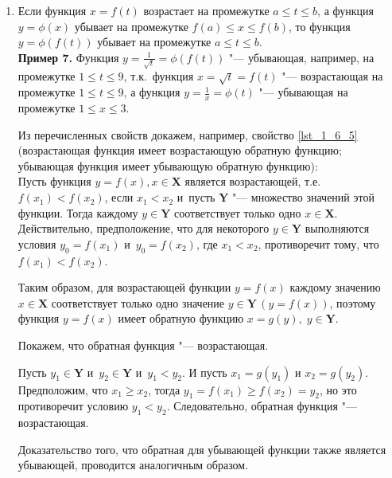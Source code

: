 \begin{enumerate}
\item Если функция $x = f(t)$  возрастает на промежутке
$a \leqslant t \leqslant b$,
а функция $y = \phi(x)$ убывает на промежутке
$f(a) \leqslant x \leqslant f(b)$, 
то функция $y = \phi(f(t))$ убывает на промежутке
$a \leqslant t \leqslant b$. \\
\textbf{Пример 7.} Функция
$\displaystyle y = \frac{1}{\sqrt{t}} = \phi(f(t))$ "--- убывающая,
например, на промежутке $1 \leqslant t \leqslant 9$,
т.к.\ функция $x = \sqrt{t} = f(t)$ "--- возрастающая на промежутке
$1 \leqslant t \leqslant 9$, а функция
$\displaystyle y = \frac{1}{x} = \phi(t)$
"--- убывающая на промежутке $1 \leqslant x \leqslant 3$.

Из перечисленных свойств докажем, например, свойство \ref{lst_1_6_5}
(возрастающая функция имеет возрастающую обратную функцию;
убывающая функция имеет убывающую обратную функцию): \\
Пусть функция $y = f(x), x \in \mathbf{X}$ является возрастающей,
т.е.\ $f(x_{1}) < f(x_{2})$, если $x_{1} < x_{2}$ и~пусть $\mathbf{Y}$
"--- множество значений этой функции. Тогда каждому $y \in \mathbf{Y}$
соответствует только одно $x \in \mathbf{X}$.
Действительно, предположение, что для некоторого $y \in \mathbf{Y}$
выполняются условия $y_{0} = f(x_{1})$ и~$y_{0} = f(x_{2})$,
где $x_{1} < x_{2}$, противоречит тому, что $f(x_{1}) < f(x_{2})$.

Таким образом, для возрастающей функции $y = f(x)$ каждому значению
$x \in \mathbf{X}$ соответствует только одно значение
$y \in \mathbf{Y} \, (y = f(x))$, поэтому функция $y = f(x)$ имеет
обратную функцию $x = g(y), \; y \in \mathbf{Y}$.

Покажем, что обратная функция "--- возрастающая.

Пусть $y_{1} \in \mathbf{Y}$ и~$y_{2} \in \mathbf{Y}$ и~$y_{1} < y_{2}$.
И пусть $x_{1} = g(y_{1})$ и $x_{2} = g(y_{2})$.
Предположим, что $x_{1} \geqslant x_{2}$, тогда
$y_{1} = f(x_{1}) \geqslant f(x_{2}) = y_{2}$, но это противоречит условию
$y_{1} < y_{2}$. Следовательно, обратная функция "--- возрастающая.

Доказательство того, что обратная для убывающей функции также является
убывающей, проводится аналогичным образом.

\end{enumerate}
